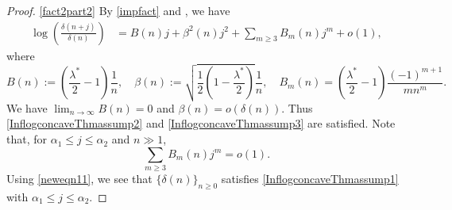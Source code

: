 \documentclass[10pt,a4paper]{amsart}
\renewcommand{\a}{\alpha}
\renewcommand{\b}{\beta}
\renewcommand{\d}{{\delta}}
\renewcommand{\l}{\lambda}
\begin{document}
\begin{proof}
\noindent \ref{fact2part2}  By \eqref{impfact} and , we have %
\begin{align}\label{neweqn11}
\log\left(\frac{\d(n+j)}{\d(n)}\right)
&=B(n)j+\beta^2(n)j^2+\sum_{m\ge 3}B_{m}(n)j^m+o(1),
\end{align}
where
\[
B(n):=\left(\frac{\l^*}{2}-1\right)\frac 1n,\quad \beta(n):=\sqrt{\frac 12\left(1-\frac{\l^*}{2}\right)}\frac 1n,\quad B_m(n)=\left(\frac{\l^*}{2}-1\right)\frac{(-1)^{m+1}}{m n^m}.
\]
We have $\lim_{n\to \infty}B(n)=0$ and $\b(n)=o(\d(n))$. Thus \ref{InflogconcaveThmassump2} and \ref{InflogconcaveThmassump3} are satisfied. Note that, for $\a_1\le j\le \a_2$ and $n\!\gg\!1$, %
\[
\sum_{m\ge 3}B_{m}(n)j^m=o(1).
\] 
Using \eqref{neweqn11}, we see that $\{\d(n)\}_{n\ge 0}$ satisfies \ref{InflogconcaveThmassump1} with $\a_1\le j\le \a_2$.\qedhere 
\end{proof}
\end{document}
